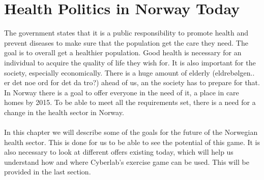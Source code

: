 \chapter{Health Politics in Norway Today}
The government states that it is a public responsibility to promote health and prevent diseases to make sure that the population get the care they need. The goal is to overall get a healthier population. Good health is necessary for an individual to acquire the quality of life they wish for. It is also important for the society, especially economically. There is a huge amount of elderly (eldrebølgen.. er det noe ord for det da tro?) ahead of us, an the society has to prepare for that. In Norway there is a goal to offer everyone in the need of it, a place in care homes by 2015.  To be able to meet all the requirements set, there is a need for a change in the health sector in Norway.\\ \\
In this chapter we will describe some of the goals for the future of the Norwegian health sector. This is done for us to be able to see the potential of this game.  It is also necessary to look at different offers existing today, which will help us understand how and where Cyberlab's exercise game can be used. This will be provided in the last section. 


